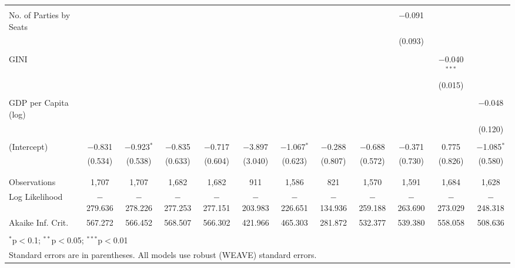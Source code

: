 \documentclass[a4paper]{article}\usepackage[]{graphicx}\usepackage[]{color}
\begin{document}
\begin{table}[H]
\begin{center}
{{\begin{tabular}{@{\extracolsep{5pt}}lccccccccccc}
  & & & & & & & & & & & \\ 
 No. of Parties by Seats &  &  &  &  &  &  &  &  & $-$0.091 &  &  \\ 
  &  &  &  &  &  &  &  &  & (0.093) &  &  \\ 
  & & & & & & & & & & & \\ 
 GINI &  &  &  &  &  &  &  &  &  & $-$0.040$^{***}$ &  \\ 
  &  &  &  &  &  &  &  &  &  & (0.015) &  \\ 
  & & & & & & & & & & & \\ 
 GDP per Capita (log) &  &  &  &  &  &  &  &  &  &  & $-$0.048 \\ 
  &  &  &  &  &  &  &  &  &  &  & (0.120) \\ 
  & & & & & & & & & & & \\ 
 (Intercept) & $-$0.831 & $-$0.923$^{*}$ & $-$0.835 & $-$0.717 & $-$3.897 & $-$1.067$^{*}$ & $-$0.288 & $-$0.688 & $-$0.371 & 0.775 & $-$1.085$^{*}$ \\ 
  & (0.534) & (0.538) & (0.633) & (0.604) & (3.040) & (0.623) & (0.807) & (0.572) & (0.730) & (0.826) & (0.580) \\ 
  & & & & & & & & & & & \\ 
\hline \\[-1.8ex] 
Observations & 1,707 & 1,707 & 1,682 & 1,682 & 911 & 1,586 & 821 & 1,570 & 1,591 & 1,684 & 1,628 \\ 
Log Likelihood & $-$279.636 & $-$278.226 & $-$277.253 & $-$277.151 & $-$203.983 & $-$226.651 & $-$134.936 & $-$259.188 & $-$263.690 & $-$273.029 & $-$248.318 \\ 
Akaike Inf. Crit. & 567.272 & 566.452 & 568.507 & 566.302 & 421.966 & 465.303 & 281.872 & 532.377 & 539.380 & 558.058 & 508.636 \\ 
\hline 
\hline \\[-1.8ex] 
\multicolumn{12}{l}{$^{*}$p$<$0.1; $^{**}$p$<$0.05; $^{***}$p$<$0.01} \\ 
\multicolumn{12}{l}{Standard errors are in parentheses. All models use robust (WEAVE) standard errors.} \\ 
\end{tabular} 

}}
\end{center}

\end{table}
\end{document}

